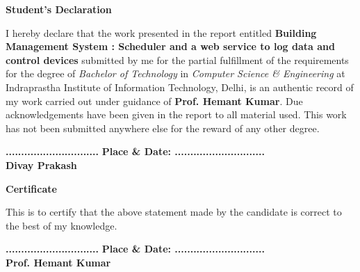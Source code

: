 \documentclass[letterpaper,11pt]{report}
\def\title{Building Management System : Scheduler and a web service to log data and control devices}
\begin{document}


\newpage
\setcounter{page}{2}
\begin{center}
\textbf{\Large Student's Declaration}\label{section:declaration}
\end{center}
I hereby declare that the work presented in the report entitled \textbf{\title{}} submitted by me for the partial fulfillment of the requirements for the degree of \emph{Bachelor of Technology} in \emph{Computer Science \& Engineering} at Indraprastha Institute of Information Technology, Delhi, is an authentic record of my work carried out under guidance of \textbf{Prof. Hemant Kumar}. Due acknowledgements have  been given in the report to all material used. This work has not been submitted anywhere else for the reward of any other degree.\\
\vspace{0.5in}

\textbf{..............................}\hfill
\textbf{ Place \& Date: .............................}\\
\textbf{Divay Prakash}

\vspace{3in}
\begin{center}
\textbf{\Large Certificate} \label{section:certificate}
\end{center}
This is to certify that the above statement made by the candidate is correct to the best of my knowledge.\\
\vspace{0.4in}

\textbf{..............................}\hfill
\textbf{ Place \& Date: .............................}\\
\textbf{Prof. Hemant Kumar}

\pagebreak

\begin{abstract}
The building management HVAC(heating, ventilation and air conditioning) system for Phase II of IIIT-Delhi campus is designed to take care (and advantage) of diversity of use. Instead of using large AHUs(Air Handling Units), we will have individual units in faculty rooms, labs, and other spaces. This would allow us to condition air of the spaces that are occupied and the system would be able to maintain desired temperature more closely. The disadvantage of this approach is higher capital cost and a larger I/O points for BMS but the running cost will be saved. In this project we are developing a scheduler hosted on a web server to control the AC’s valves connected through Raspberry Pi and Arduino.
\par
\vspace{2.15in}
Keywords: building management system, scheduler, web server 
\end{abstract}
\end{document}
